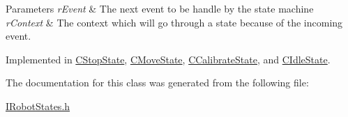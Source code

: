 \begin{DoxyParams}{Parameters}
{\em r\+Event} & The next event to be handle by the state machine \\
\hline
{\em r\+Context} & The context which will go through a state because of the incoming event. \\
\hline
\end{DoxyParams}


Implemented in \hyperlink{classCStopState_abe6af38d9c6b80b98fd78cdb48d7599c}{C\+Stop\+State}, \hyperlink{classCMoveState_a49c6051142c4839e1a512f38859589ad}{C\+Move\+State}, \hyperlink{classCCalibrateState_af24b30b6357a7b48f1157afdc0662984}{C\+Calibrate\+State}, and \hyperlink{classCIdleState_a12d0c6b590c56cdc9018524d632d4871}{C\+Idle\+State}.



The documentation for this class was generated from the following file\+:\begin{DoxyCompactItemize}
\item 
\hyperlink{IRobotStates_8h}{I\+Robot\+States.\+h}\end{DoxyCompactItemize}
